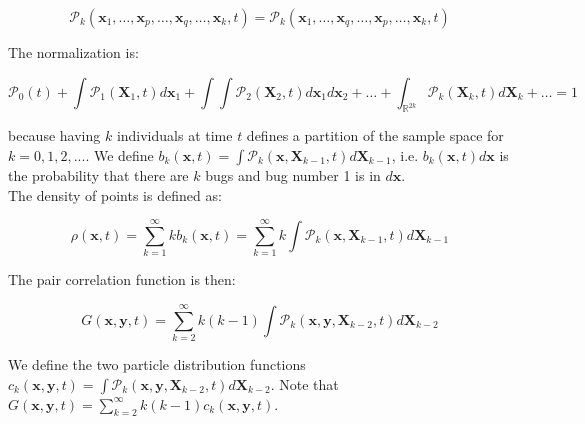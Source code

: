 \begin{equation}
\mathcal{P}_{k}(\boldsymbol{x}_{1},\ldots,\boldsymbol{x}_{p},\ldots,\boldsymbol{x}_{q},\ldots,\boldsymbol{x}_{k},t)=\mathcal{P}_{k}(\boldsymbol{x}_{1},\ldots,\boldsymbol{x}_{q},\ldots,\boldsymbol{x}_{p},\ldots,\boldsymbol{x}_{k},t)
\end{equation}

\vspace{1.25em}

The normalization is: 

\begin{equation}
\mathcal{P}_{0}(t)+\int\mathcal{P}_{1}(\boldsymbol{X}_{1},t)d\boldsymbol{x}_{1}+\int\int\mathcal{P}_{2}(\boldsymbol{X}_{2},t)d\boldsymbol{x}_{1}d\boldsymbol{x}_{2}+\ldots+\int_{\mathbb{R}^{2k}}\mathcal{P}_{k}(\boldsymbol{X}_{k},t)d\boldsymbol{X}_{k}+\ldots=1
\end{equation}

\vspace{1.25em}
because having $k$ individuals at time $t$ defines a partition of the sample space for $k=0,1,2,...$. 
We define $b_{k}(\boldsymbol{x},t)=\int\mathcal{P}_{k}(\boldsymbol{x},\boldsymbol{X}_{k-1},t)d\boldsymbol{X}_{k-1}$, i.e. $b_{k}(\boldsymbol{x},t)d\boldsymbol{x}$ is 
the probability that there are $k$ bugs and bug number 1 is in $d\boldsymbol{x}$.\\

The density of points is defined as:

\begin{equation}
\rho(\boldsymbol{x},t)=\sum_{k=1}^{\infty}kb_{k}(\boldsymbol{x},t)=\sum_{k=1}^{\infty}k\int\mathcal{P}_{k}(\boldsymbol{x},\boldsymbol{X}_{k-1},t)d\boldsymbol{X}_{k-1}
\end{equation}

The pair correlation function is then:

\begin{equation}
G(\boldsymbol{x},\boldsymbol{y},t)=\sum_{k=2}^{\infty}k(k-1)\int\mathcal{P}_{k}(\boldsymbol{x},\boldsymbol{y},\boldsymbol{X}_{k-2},t)d\boldsymbol{X}_{k-2} \label{eq:def_pairdens}
\end{equation}

We define the two particle distribution functions $c_{k}(\boldsymbol{x},\boldsymbol{y},t)=\int\mathcal{P}_{k}(\boldsymbol{x},\boldsymbol{y},\boldsymbol{X}_{k-2},t)d\boldsymbol{X}_{k-2}$. Note that $G(\boldsymbol{x},\boldsymbol{y},t)=\sum_{k=2}^{\infty}k(k-1)c_{k}(\boldsymbol{x},\boldsymbol{y},t)$.\\


